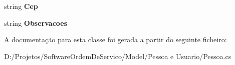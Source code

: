 \begin{DoxyCompactItemize}
\item 
\hypertarget{class_model_1_1_pessoa__e___usuario_1_1_pessoa_a52bd778675e844d78867afa43018f7ad}{}string {\bfseries Cep}\label{class_model_1_1_pessoa__e___usuario_1_1_pessoa_a52bd778675e844d78867afa43018f7ad}

\item 
\hypertarget{class_model_1_1_pessoa__e___usuario_1_1_pessoa_af6c352f8039298ee93e7efeb4427f945}{}string {\bfseries Observacoes}\label{class_model_1_1_pessoa__e___usuario_1_1_pessoa_af6c352f8039298ee93e7efeb4427f945}

\end{DoxyCompactItemize}


A documentação para esta classe foi gerada a partir do seguinte ficheiro\+:\begin{DoxyCompactItemize}
\item 
D\+:/\+Projetos/\+Software\+Ordem\+De\+Servico/\+Model/\+Pessoa e Usuario/Pessoa.\+cs\end{DoxyCompactItemize}
